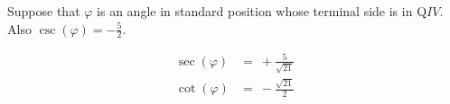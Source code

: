 Suppose that $\varphi$ is an angle in standard position whose terminal side is in Q$IV$. Also $\csc(\varphi) = -\frac{5}{2}$.

$$
\begin{align*}
  \sec(\varphi) &=\ +\frac{5}{\sqrt{21}} \\
  \cot(\varphi) &=\ -\frac{\sqrt{21}}{2} \\
\end{align*}
$$
